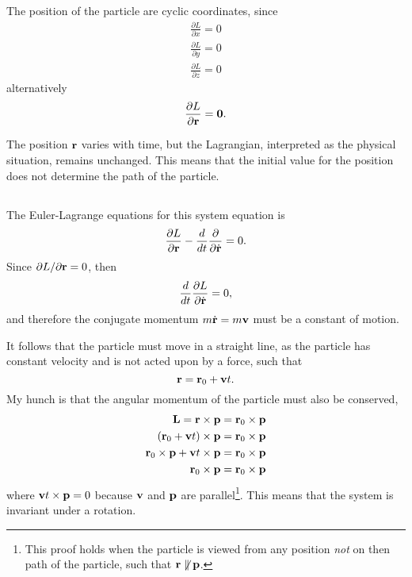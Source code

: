 \documentclass[11pt]{amsart}
\begin{document}
\subsection{}
The position of the particle are cyclic coordinates, since
\begin{align*}
\frac{\partial L}{\partial x} = 0 \\
\frac{\partial L}{\partial y} = 0 \\
\frac{\partial L}{\partial z} = 0 
\end{align*}
alternatively
\begin{equation}
\frac{\partial L}{\partial \vb{r}} = \vb{0}.
\end{equation}

The position $\vb{r}$ varies with time, but the Lagrangian, interpreted as the physical situation, remains unchanged. This means that the initial value for the position does not determine the path of the particle. 

\subsection{}
The Euler-Lagrange equations for this system equation is
\begin{equation}
\frac{\partial L}{\partial \vb{r}} - \frac{d}{dt}\frac{\partial}{\partial\dot{\vb{r}}} = 0.
\end{equation}
Since $\partial L / \partial \vb{r} = 0$, then
\begin{equation*}
\frac{d}{dt}\frac{\partial L}{\partial \dot{\vb{r}}} = 0,
\end{equation*}
and therefore the conjugate momentum $m\dot{\vb{r}}=m\vb{v}$ must be a constant of motion.

It follows that the particle must move in a straight line, as the particle has constant velocity and is not acted upon by a force, such that
\begin{equation}
\vb{r} = \vb{r}_0 + \vb{v}t.
\end{equation}
My hunch is that the angular momentum of the particle must also be conserved,
\begin{align*}
\vb{L} = \vb{r} \times \vb{p} &= \vb{r}_0 \times \vb{p} \\
(\vb{r}_0 + \vb{v}t) \times \vb{p} &= \vb{r}_0 \times \vb{p} \\
\vb{r}_0 \times \vb{p} + \vb{v}t \times \vb{p} &= \vb{r}_0 \times \vb{p} \\
\vb{r}_0 \times \vb{p} &= \vb{r}_0 \times \vb{p}
\end{align*}
where $\vb{v}t \times \vb{p} = 0$ because $\vb{v}$ and $\vb{p}$ are parallel\footnote{This proof holds when the particle is viewed from any position \emph{not} on then path of the particle, such that $\vb{r} \not\parallel \vb{p}$.}. This means that the system is invariant under a rotation.
\end{document}
